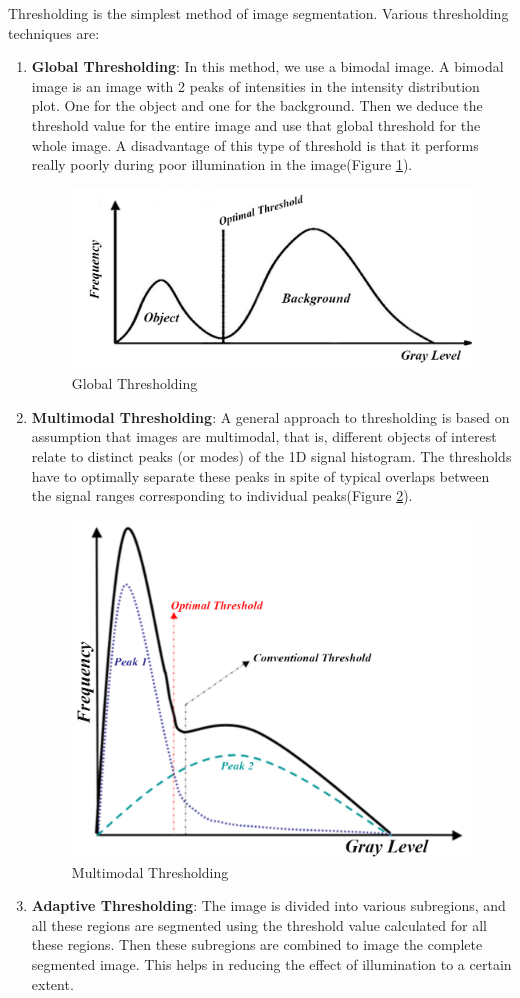 Thresholding is the simplest method of image segmentation. Various thresholding techniques are:
\begin{enumerate}
	\item \textbf{Global Thresholding}: In this method, we use a bimodal image. A bimodal image is an image with 2 peaks of intensities in the intensity distribution plot. One for the object and one for the background. Then we deduce the threshold value for the entire image and use that global threshold for the whole image. A disadvantage of this type of threshold is that it performs really poorly during poor illumination in the image(Figure \ref{fig21}).
	
	\begin{figure}[htbp]
		\centering \includegraphics[width=0.55\columnwidth]{./figures/Fig21.jpg}
		\caption{Global Thresholding}
		\label{fig21}
	\end{figure}
	
	\item \textbf{Multimodal Thresholding}: A general approach to thresholding is based on assumption that images are multimodal, that is, different objects of interest relate to distinct peaks (or modes) of the 1D signal histogram. The thresholds have to optimally separate these peaks in spite of typical overlaps between the signal ranges corresponding to individual peaks(Figure \ref{fig22}).
	
	\begin{figure}[htbp]
		\centering \includegraphics[width=0.55\columnwidth]{./figures/Fig22.jpg}
		\caption{Multimodal Thresholding}
		\label{fig22}
	\end{figure}
	
	\item \textbf{Adaptive Thresholding}: The image is divided into various subregions, and all these regions are segmented using the threshold value calculated for all these regions. Then these subregions are combined to image the complete segmented image. This helps in reducing the effect of illumination to a certain extent.
	
\end{enumerate}



